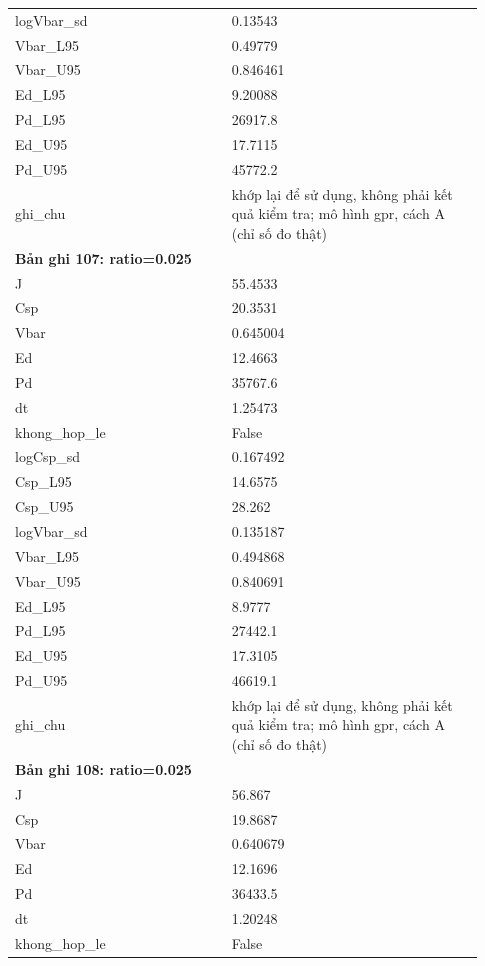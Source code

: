 \begin{longtable}{p{0.43\linewidth}p{0.50\linewidth}}
logVbar\_\allowbreak sd & 0.13543 \\
Vbar\_\allowbreak L95 & 0.49779 \\
Vbar\_\allowbreak U95 & 0.846461 \\
Ed\_\allowbreak L95 & 9.20088 \\
Pd\_\allowbreak L95 & 26917.8 \\
Ed\_\allowbreak U95 & 17.7115 \\
Pd\_\allowbreak U95 & 45772.2 \\
ghi\_\allowbreak chu & khớp lại để sử dụng, không phải kết quả kiểm tra; mô hình gpr, cách A (chỉ số đo thật) \\
\midrule
\multicolumn{2}{p{0.95\linewidth}}{\textbf{Bản ghi 107: ratio=0.025}} \\
J & 55.4533 \\
Csp & 20.3531 \\
Vbar & 0.645004 \\
Ed & 12.4663 \\
Pd & 35767.6 \\
dt & 1.25473 \\
khong\_\allowbreak hop\_\allowbreak le & False \\
logCsp\_\allowbreak sd & 0.167492 \\
Csp\_\allowbreak L95 & 14.6575 \\
Csp\_\allowbreak U95 & 28.262 \\
logVbar\_\allowbreak sd & 0.135187 \\
Vbar\_\allowbreak L95 & 0.494868 \\
Vbar\_\allowbreak U95 & 0.840691 \\
Ed\_\allowbreak L95 & 8.9777 \\
Pd\_\allowbreak L95 & 27442.1 \\
Ed\_\allowbreak U95 & 17.3105 \\
Pd\_\allowbreak U95 & 46619.1 \\
ghi\_\allowbreak chu & khớp lại để sử dụng, không phải kết quả kiểm tra; mô hình gpr, cách A (chỉ số đo thật) \\
\midrule
\multicolumn{2}{p{0.95\linewidth}}{\textbf{Bản ghi 108: ratio=0.025}} \\
J & 56.867 \\
Csp & 19.8687 \\
Vbar & 0.640679 \\
Ed & 12.1696 \\
Pd & 36433.5 \\
dt & 1.20248 \\
khong\_\allowbreak hop\_\allowbreak le & False \\

\end{longtable}
